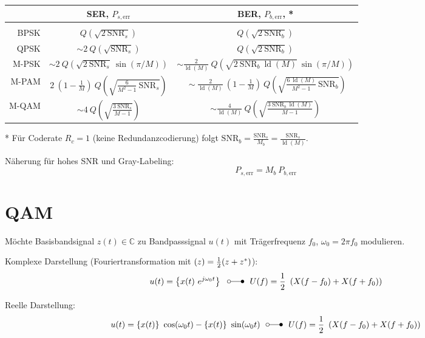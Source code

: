 \documentclass[a4paper, 11pt]{article}
\newcommand{\ftransform}{~~\laplace~~}
\DeclareMathOperator{\ld}{ld}
\let\Re\relax
\let\Im\relax
\DeclareMathOperator{\Re}{Re}
\DeclareMathOperator{\Im}{Im}
\begin{document}
\begin{center}
	\begin{tabular}{r | c c}
		& SER, $P_{s, \mathrm{err}}$ & BER, $P_{b, \mathrm{err}}$, * \\ \hline \\[-1.0em]
		BPSK & $Q \left( \sqrt{2 ~ \mathrm{SNR}_s} \right)$ & $Q \left( \sqrt{2 ~ \mathrm{SNR}_b} \right)$ \\
		QPSK & $\sim 2 ~ Q \left( \sqrt{\mathrm{SNR}_s} \right)$  & $Q \left( \sqrt{2 ~ \mathrm{SNR}_b} \right)$ \\
		M-PSK & $\sim 2 ~ Q \left( \sqrt{2 ~ \mathrm{SNR}_s} ~ \sin(\pi / M) \right)$ & $\sim \frac{2}{\ld(M)} ~ Q \left( \sqrt{2 ~ \mathrm{SNR}_b ~ \ld(M)} ~ \sin(\pi / M) \right)$ \\
		M-PAM & $2 ~ \left( 1 - \frac{1}{M} \right) ~ Q \left(\sqrt{\frac{6}{M^2 - 1} ~ \mathrm{SNR}_s} \right)$ & $~\sim \frac{2}{\ld(M)} ~ \left( 1 - \frac{1}{M} \right) ~ Q \left(\sqrt{\frac{6 ~ \ld(M)}{M^2 - 1} ~ \mathrm{SNR}_b} \right)$ \\
		M-QAM & $\sim 4 ~ Q \left( \sqrt{\frac{3 ~ \mathrm{SNR}_s}{M - 1}} \right)$ & $\sim \frac{4}{\ld(M)} ~ Q \left( \sqrt{\frac{3 ~ \mathrm{SNR}_b ~ \ld(M)}{M - 1}} \right)$
	\end{tabular}
\end{center}

\vspace{5pt}

* Für Coderate $R_c = 1$ (keine Redundanzcodierung) folgt $\mathrm{SNR}_b = \frac{\mathrm{SNR}_s}{M_b} = \frac{\mathrm{SNR}_s}{\ld(M)}$.

Näherung für hohes SNR und Gray-Labeling:
\[
	P_{s, \mathrm{err}} = M_b ~ P_{b, \mathrm{err}}
\]

\section*{QAM}
Möchte Basisbandsignal $z(t) \in \mathbb C$ zu Bandpasssignal $u(t)$ mit Trägerfrequenz $f_0$, $\omega_0 = 2 \pi f_0$ modulieren.

\raggedright
Komplexe Darstellung (Fouriertransformation mit $\Re(z) = \frac{1}{2} (z + z^*)$):
\[
	u(t) = \Re \left \{ x(t) ~ e^{j \omega_0 t} \right \} \ftransform U(f) = \frac{1}{2} ~ \left( X(f - f_0) + X(f + f_0) \right)
\]

\raggedright
Reelle Darstellung:
\[
	u(t) = \Re \{ x(t) \} ~ \cos(\omega_0 t) - \Im \{ x(t) \} ~ \sin(\omega_0 t) \ftransform U(f) = \frac{1}{2} ~ \left( X(f - f_0) + X(f + f_0) \right)
\]
\end{document}
